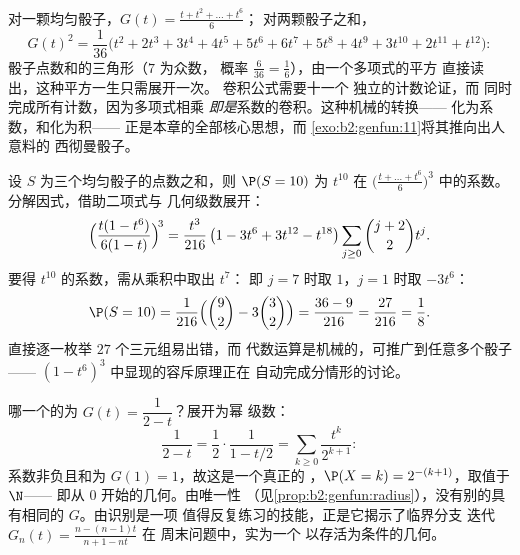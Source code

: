 \begin{example}\label{ex:b2:genfun:twodice}
对一颗均匀骰子，$G(t) = \frac{t + t^2 + \dots + t^6}{6}$；
对两颗骰子之和，
\[
G(t)^2 = \frac{1}{36}\bigl(t^2 + 2t^3 + 3t^4 + 4t^5 + 5t^6 +
6t^7 + 5t^8 + 4t^9 + 3t^{10} + 2t^{11} + t^{12}\bigr) :
\]
骰子点数和的三角形（$7$ 为众数，
概率 $\frac6{36} = \frac16$），由一个多项式的平方
直接读出，这种平方一生只需展开一次。
卷积公式需要十一个
独立的计数论证，而
同时完成所有计数，因为多项式相乘
\emph{即是}系数的卷积。这种机械的转换——
化为系数，和化为积——
正是本章的全部核心思想，而
\cref{exo:b2:genfun:11}将其推向出人意料的
西彻曼骰子。
\end{example}

\begin{example}\label{ex:b2:genfun:threedice}
设 $S$ 为三个均匀骰子的点数之和，则 $\P(S = 10)$ 为
$t^{10}$ 在 $\bigl(\frac{t + \dots +
t^6}6\bigr)^3$ 中的系数。分解因式，借助二项式与
几何级数展开：
\[
\Bigl(\frac{t(1 - t^6)}{6(1 - t)}\Bigr)^{\!3}
= \frac{t^3}{216}\,\bigl(1 - 3t^6 + 3t^{12} -
t^{18}\bigr)\sum_{j\geq0}\binom{j+2}2t^j .
\]
要得 $t^{10}$ 的系数，需从乘积中取出 $t^7$：
即 $j = 7$ 时取 $1$，$j = 1$ 时取
$-3t^6$：
\[
\P(S = 10) = \frac{1}{216}\Bigl(\binom92 -
3\binom32\Bigr) = \frac{36 - 9}{216} = \frac{27}{216} =
\frac18 .
\]
直接逐一枚举 $27$ 个三元组易出错，而
代数运算是机械的，可推广到任意多个骰子——
$(1 - t^6)^3$ 中显现的容斥原理正在
自动完成分情形的讨论。
\end{example}

\begin{example}[由母函数读出
分布]\label{ex:b2:genfun:identify}
哪一个的为 $G(t) = \dfrac1{2 - t}$？展开为幂
级数：
\[
\frac{1}{2 - t} = \frac12\cdot\frac1{1 - t/2}
= \sum_{k\geq0}\frac{t^k}{2^{k+1}} :
\]
系数非负且和为 $G(1) = 1$，故这是一个真正的
，$\P(X = k) = 2^{-(k+1)}$，取值于 $\N$——
即从 $0$ 开始的几何。由唯一性
（见\cref{prop:b2:genfun:radius}），没有别的具有相同的
$G$。由识别是一项
值得反复练习的技能，正是它揭示了临界分支
迭代 $G_n(t) = \frac{n - (n-1)t}{n+1 - nt}$ 在
周末问题中，实为一个
以存活为条件的几何。
\end{example}

